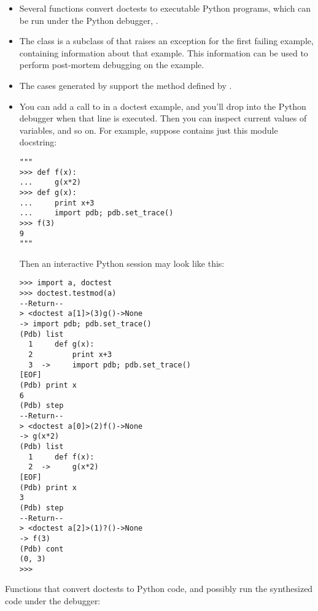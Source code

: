 \begin{itemize}
\item Several functions convert doctests to executable Python
      programs, which can be run under the Python debugger, .
\item The  class is a subclass of
       that raises an exception for the first
      failing example, containing information about that example.
      This information can be used to perform post-mortem debugging on
      the example.
\item The  cases generated by 
      support the  method defined by
      .
\item You can add a call to  in a
      doctest example, and you'll drop into the Python debugger when that
      line is executed.  Then you can inspect current values of variables,
      and so on.  For example, suppose  contains just this
      module docstring:

\begin{verbatim}
"""
>>> def f(x):
...     g(x*2)
>>> def g(x):
...     print x+3
...     import pdb; pdb.set_trace()
>>> f(3)
9
"""
\end{verbatim}

      Then an interactive Python session may look like this:

\begin{verbatim}
>>> import a, doctest
>>> doctest.testmod(a)
--Return--
> <doctest a[1]>(3)g()->None
-> import pdb; pdb.set_trace()
(Pdb) list
  1     def g(x):
  2         print x+3
  3  ->     import pdb; pdb.set_trace()
[EOF]
(Pdb) print x
6
(Pdb) step
--Return--
> <doctest a[0]>(2)f()->None
-> g(x*2)
(Pdb) list
  1     def f(x):
  2  ->     g(x*2)
[EOF]
(Pdb) print x
3
(Pdb) step
--Return--
> <doctest a[2]>(1)?()->None
-> f(3)
(Pdb) cont
(0, 3)
>>>
\end{verbatim}

\end{itemize}

Functions that convert doctests to Python code, and possibly run
the synthesized code under the debugger:

